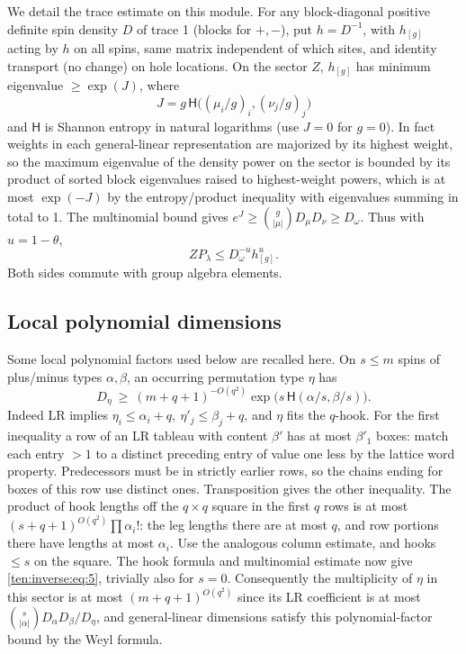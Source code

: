 We detail the trace estimate on this module. For any block-diagonal positive definite spin density \(D\) of trace 1 (blocks for \(+,-\)), put \(h=D^{-1}\), with \(h_{[g]}\) acting by \(h\) on all spins, same matrix independent of which sites, and identity transport (no change) on hole locations. On the sector \(Z\), \(h_{[g]}\) has minimum eigenvalue \(\ge\exp(J)\), where
\[
 J=g\,\mathsf H\big((\mu_i/g)_i,(\nu_j/g)_j\big)
\]
and \(\mathsf H\) is Shannon entropy in natural logarithms (use \(J=0\) for \(g=0\)). In fact weights in each general-linear representation are majorized by its highest weight, so the maximum eigenvalue of the density power on the sector is bounded by its product of sorted block eigenvalues raised to highest-weight powers, which is at most \(\exp(-J)\) by the entropy/product inequality with eigenvalues summing in total to 1. The multinomial bound gives \(e^J\ge\binom g{|\mu|} D_\mu D_\nu\ge D_\omega\). Thus with \(u=1-\theta\),
\begin{equation}
 ZP_\lambda\le D_\omega^{-u} h_{[g]}^u.
 \label{ten:inverse:eq:4}
\end{equation}
Both sides commute with group algebra elements.

\subsection{Local polynomial dimensions}
Some local polynomial factors used below are recalled here. On \(s\le m\) spins of plus/minus types \(\alpha,\beta\), an occurring permutation type \(\eta\) has
\begin{equation}
 D_\eta \ \ge\ (m+q+1)^{-O(q^2)}
 \exp\big(s\,\mathsf H(\alpha/s,\beta/s)\big).
 \label{ten:inverse:eq:5}
\end{equation}
Indeed LR implies \(\eta_i\le\alpha_i+q,\ \eta'_j\le\beta_j+q\), and \(\eta\) fits the \(q\)-hook. For the first inequality a row of an LR tableau with content \(\beta'\) has at most \(\beta'_1\) boxes: match each entry \(>1\) to a distinct preceding entry of value one less by the lattice word property. Predecessors must be in strictly earlier rows, so the chains ending for boxes of this row use distinct ones. Transposition gives the other inequality. The product of hook lengths off the \(q\times q\) square in the first \(q\) rows is at most \((s+q+1)^{O(q^2)}\prod\alpha_i!\): the leg lengths there are at most \(q\), and row portions there have lengths at most \(\alpha_i\). Use the analogous column estimate, and hooks \(\le s\) on the square. The hook formula and multinomial estimate now give \eqref{ten:inverse:eq:5}, trivially also for \(s=0\). Consequently the multiplicity of \(\eta\) in this sector is at most \((m+q+1)^{O(q^2)}\) since its LR coefficient is at most \(\binom{s}{|\alpha|}D_\alpha D_\beta / D_\eta\), and general-linear dimensions satisfy this polynomial-factor bound by the Weyl formula.

